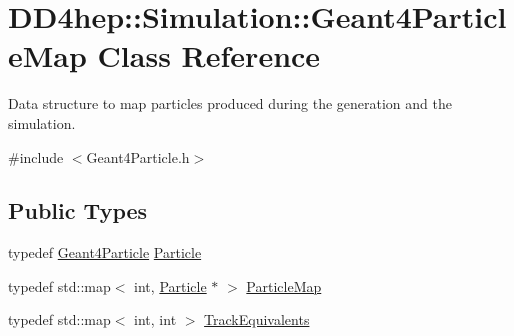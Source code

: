 \hypertarget{class_d_d4hep_1_1_simulation_1_1_geant4_particle_map}{
\section{DD4hep::Simulation::Geant4ParticleMap Class Reference}
\label{class_d_d4hep_1_1_simulation_1_1_geant4_particle_map}
}


Data structure to map particles produced during the generation and the simulation.  


{\ttfamily \#include $<$Geant4Particle.h$>$}\subsection*{Public Types}
\begin{DoxyCompactItemize}
\item 
typedef \hyperlink{class_d_d4hep_1_1_simulation_1_1_geant4_particle}{Geant4Particle} \hyperlink{class_d_d4hep_1_1_simulation_1_1_geant4_particle_map_a01ed68f2fc2e55ecf936e5ac3e6eae5f}{Particle}
\item 
typedef std::map$<$ int, \hyperlink{class_d_d4hep_1_1_simulation_1_1_geant4_particle}{Particle} $\ast$ $>$ \hyperlink{class_d_d4hep_1_1_simulation_1_1_geant4_particle_map_a065c5fb0629285022b9aa2a628bffef3}{ParticleMap}
\item 
typedef std::map$<$ int, int $>$ \hyperlink{class_d_d4hep_1_1_simulation_1_1_geant4_particle_map_aba09f5fcb2dd5874d129660ad4454a21}{TrackEquivalents}
\end{DoxyCompactItemize}
